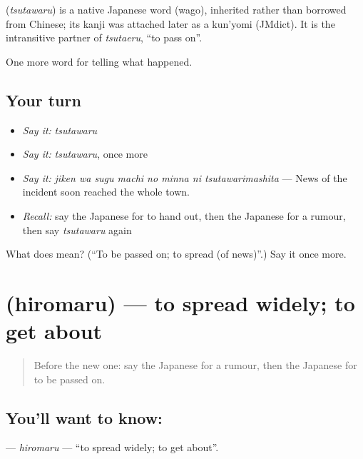 \begin{cousinweb}
\textbf{} (\emph{tsutawaru}) is a native Japanese word (wago), inherited rather than borrowed from Chinese; its kanji was attached later as a kun'yomi (JMdict). It is the intransitive partner of \emph{tsutaeru}, \textquotedblleft{}to pass on\textquotedblright{}.
\end{cousinweb}

\begin{grammarlens}[title={What you've built}]
One more word for telling what happened.
\end{grammarlens}

\subsection*{Your turn}
\begin{itemize}
\raggedright
  \item \emph{Say it:} \emph{tsutawaru}
  \item \emph{Say it:} \emph{tsutawaru}, once more
  \item \emph{Say it:} \emph{jiken wa sugu machi no minna ni tsutawarimashita} — News of the incident soon reached the whole town.
  \item \emph{Recall:} say the Japanese for to hand out, then the Japanese for a rumour, then say \emph{tsutawaru} again
\end{itemize}

\begin{tcolorbox}[breakable,colback=teal!4,colframe=teal!35!black,title={Before you move on}]
What does  mean? (\textquotedblleft{}To be passed on; to spread (of news)\textquotedblright{}.) Say it once more.
\end{tcolorbox}
\section[\texorpdfstring{\ja{ひろまる} (hiromaru)}{ひろまる (hiromaru)}]{ (hiromaru) — to spread widely; to get about}

\label{lesson:JA-C281-hiromaru}



\begin{quote}
Before the new one: say the Japanese for a rumour, then the Japanese for to be passed on.
\end{quote}

\subsection*{You'll want to know: }
\textbf{} — \emph{hiromaru} — \textquotedblleft{}to spread widely; to get about\textquotedblright{}.

